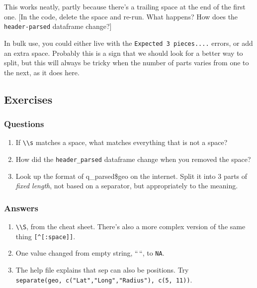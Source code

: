 \documentclass[
]{book}
\providecommand{\tightlist}{%
  \setlength{\itemsep}{0pt}\setlength{\parskip}{0pt}}
\begin{document}
This works neatly, partly because there's a trailing space at the end of the first one. {[}In the code, delete the space and re-run. What happens? How does the \texttt{header-parsed} dataframe change?{]}

In bulk use, you could either live with the \texttt{Expected\ 3\ pieces....} errors, or add an extra space. Probably this is a sign that we should look for a better way to split, but this will always be tricky when the number of parts varies from one to the next, as it does here.

\hypertarget{exercises-9}{%
\subsection{Exercises}\label{exercises-9}}

\hypertarget{questions-13}{%
\subsubsection{Questions}\label{questions-13}}

\begin{enumerate}
\def\labelenumi{\arabic{enumi})}
\tightlist
\item
  If \texttt{\textbackslash{}\textbackslash{}s} matches a space, what matches everything that is not a space?
\item
  How did the \texttt{header\_parsed} dataframe change when you removed the space?
\item
  Look up the format of q\_parsed\$geo on the internet. Split it into 3 parts of \emph{fixed length}, not based on a separator, but appropriately to the meaning.
\end{enumerate}

\hypertarget{answers-13}{%
\subsubsection{Answers}\label{answers-13}}

\begin{enumerate}
\def\labelenumi{\arabic{enumi})}
\tightlist
\item
  \texttt{\textbackslash{}\textbackslash{}S}, from the cheat sheet. There's also a more complex version of the same thing \texttt{{[}\^{}{[}:space{]}{]}}.
\item
  One value changed from empty string, ``\,``, to \texttt{NA}.
\item
  The help file explains that sep can also be positions. Try \texttt{separate(geo,\ c("Lat","Long","Radius"),\ c(5,\ 11))}.
\end{enumerate}
\end{document}
